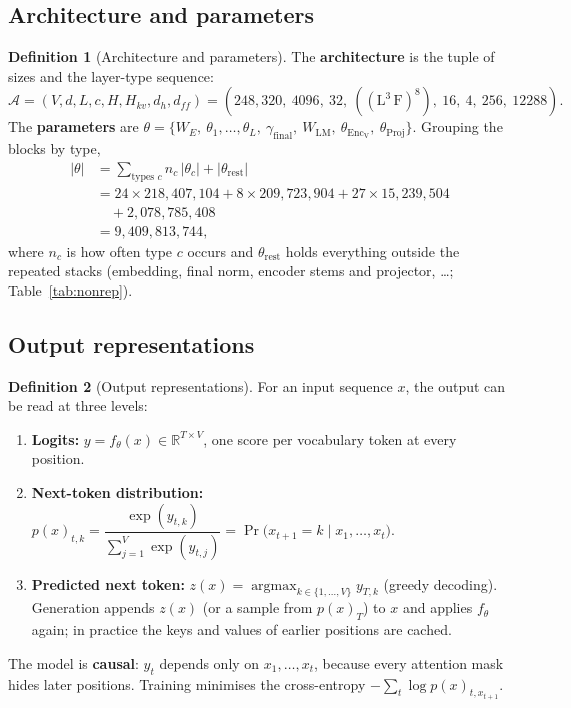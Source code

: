 \documentclass[10pt,a4paper]{article}
\newcommand{\op}[1]{\operatorname{#1}}
\theoremstyle{definition}
\newtheorem{definition}{Definition}[section]
\begin{document}
\subsection{Architecture and parameters}
\begin{definition}[Architecture and parameters]
The \textbf{architecture} is the tuple of sizes and the layer-type sequence:
\begin{equation}
  \mathcal{A} = (V,d,L,c,H,H_{kv},d_h,d_{ff}) = (248{,}320,\ 4096,\ 32,\ ((\mathrm{L}^{3}\,\mathrm{F})^{8}),\ 16,\ 4,\ 256,\ 12288).
\end{equation}
The \textbf{parameters} are $\theta=\{W_E,\ \theta_1,\dots,\theta_L,\ \gamma_{\mathrm{final}},\ W_{\mathrm{LM}},\ \theta_{\op{Enc_V}},\ \theta_{\op{Proj}}\}$. Grouping the blocks by type,
\begin{align*}
  |\theta| &= \sum_{\text{types } c} n_c\,|\theta_c| + |\theta_{\mathrm{rest}}| \\
  &= 24\times218{,}407{,}104 + 8\times209{,}723{,}904 + 27\times15{,}239{,}504 \\
  &\quad+ 2{,}078{,}785{,}408 \\
  &= 9{,}409{,}813{,}744,
\end{align*}
where $n_c$ is how often type $c$ occurs and $\theta_{\mathrm{rest}}$ holds everything outside the repeated stacks (embedding, final norm, encoder stems and projector, \dots; Table~\ref{tab:nonrep}).
\end{definition}
\subsection{Output representations}
\begin{definition}[Output representations]
For an input sequence $x$, the output can be read at three levels:
\begin{enumerate}
\item \textbf{Logits:} $y=f_\theta(x)\in\mathbb{R}^{T\times V}$, one score per vocabulary token at every position.
\item \textbf{Next-token distribution:} $p(x)_{t,k}=\dfrac{\exp(y_{t,k})}{\sum_{j=1}^{V}\exp(y_{t,j})}=\Pr\big(x_{t+1}=k\mid x_{1},\dots,x_{t}\big)$.
\item \textbf{Predicted next token:} $z(x)=\operatorname{argmax}_{k\in\{1,\dots,V\}} y_{T,k}$ (greedy decoding). Generation appends $z(x)$ (or a sample from $p(x)_{T}$) to $x$ and applies $f_\theta$ again; in practice the keys and values of earlier positions are cached.
\end{enumerate}
The model is \textbf{causal}: $y_t$ depends only on $x_1,\dots,x_t$, because every attention mask hides later positions. Training minimises the cross-entropy $-\sum_{t}\log p(x)_{t,x_{t+1}}$.
\end{definition}
\end{document}
